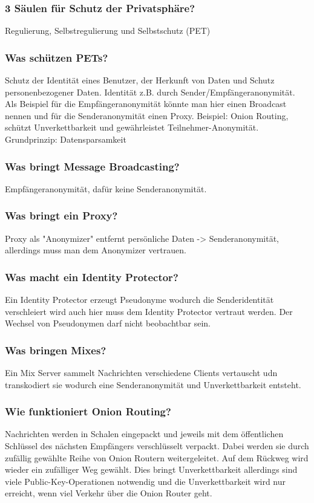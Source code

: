 	\subsubsection{3 Säulen für Schutz der Privatsphäre?}
	Regulierung, Selbstregulierung und Selbstschutz (PET)
	
	\subsubsection{Was schützen PETs?}
	Schutz der Identität eines Benutzer, der Herkunft von Daten und Schutz personenbezogener Daten.
	Identität z.B. durch Sender/Empfängeranonymität. Als Beispiel für die Empfängeranonymität könnte man hier einen Broadcast nennen und für die Senderanonymität einen Proxy. 
	Beispiel: Onion Routing, schützt Unverkettbarkeit und gewährleistet Teilnehmer-Anonymität.
	\newline
	Grundprinzip: Datensparsamkeit
	
	\subsubsection{Was bringt Message Broadcasting?}
	Empfängeranonymität, dafür keine Senderanonymität.
	
	\subsubsection{Was bringt ein Proxy?}
	Proxy als "Anonymizer" entfernt persönliche Daten -> Senderanonymität, allerdings muss man dem Anonymizer vertrauen.
	
	\subsubsection{Was macht ein Identity Protector?}
	Ein Identity Protector erzeugt Pseudonyme wodurch die Senderidentität verschleiert wird auch hier muss dem Identity Protector vertraut werden.
	Der Wechsel von Pseudonymen darf nicht beobachtbar sein.
	
	\subsubsection{Was bringen Mixes?}
	Ein Mix Server sammelt Nachrichten verschiedene Clients vertauscht udn transkodiert sie wodurch eine Senderanonymität und Unverkettbarkeit entsteht.
	
	\subsubsection{Wie funktioniert Onion Routing?}
	 Nachrichten werden in Schalen eingepackt und jeweils mit dem öffentlichen Schlüssel des nächsten Empfängers verschlüsselt verpackt. Dabei werden sie durch zufällig gewählte Reihe von Onion Routern weitergeleitet. Auf dem Rückweg wird wieder ein zufälliger Weg gewählt. 
	 \newline
	 Dies bringt Unverkettbarkeit allerdings sind viele Public-Key-Operationen notwendig und die Unverkettbarkeit wird nur erreicht, wenn viel Verkehr über die Onion Router geht.
	
